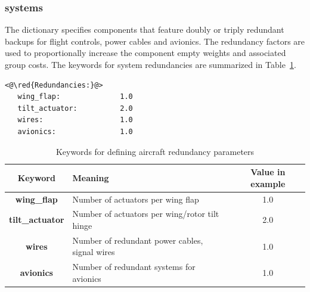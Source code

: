 \subsubsection{ systems}
The dictionary  specifies components that feature doubly or triply redundant backups for flight controls, power cables and avionics. The redundancy factors are used to proportionally increase the component empty weights and associated group costs. The keywords for system redundancies are summarized in Table~\ref{tbl:redund_keywords}.

\begin{lstlisting}
<@\red{Redundancies:}@>
   wing_flap:              1.0 
   tilt_actuator:          2.0
   wires:                  1.0
   avionics:               1.0
\end{lstlisting}

\begin{table}[H]
\begin{center}
	\caption{Keywords for defining aircraft redundancy parameters}
	\label{tbl:redund_keywords}
    \begin{tabular}{| c | l | c |}
    \hline
    Keyword & Meaning & Value in example \\ 
    \hline
\textbf{wing\_flap} & Number of actuators per wing flap &  1.0 \\
\textbf{tilt\_actuator} & Number of actuators per wing/rotor tilt hinge &  2.0 \\
\textbf{wires} & Number of redundant power cables, signal wires &  1.0 \\
\textbf{avionics} & Number of redundant systems for avionics &  1.0 \\
\hline
  \end{tabular}
\end{center}
\end{table}